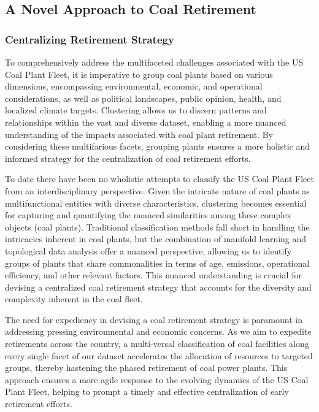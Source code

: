 \subsection{A Novel Approach to Coal Retirement}

\subsubsection{Centralizing Retirement Strategy}

To comprehensively address the multifaceted challenges associated with the US Coal Plant Fleet, it is imperative to group coal plants based on various dimensions, 
encompassing environmental, economic, and operational considerations, as well as political landscapes, public opinion, health, and localized climate targets. Clustering allows us to discern patterns and relationships within the vast and diverse dataset, 
enabling a more nuanced understanding of the impacts associated with coal plant retirement. By considering these multifarious facets, grouping plants ensures a more 
holistic and informed strategy for the centralization of coal retirement efforts.

To date there have been no wholistic attempts to classify the US Coal Plant Fleet from an interdisciplinary perspective. Given the intricate nature of coal 
plants as multifunctional entities with diverse characteristics, clustering becomes essential for capturing and quantifying the nuanced similarities among these 
complex objects (coal plants). Traditional classification methods fall short in handling the intricacies inherent in coal plants, but the combination of manifold learning and topological data analysis offer 
a nuanced perspective, allowing us to identify groups of plants that share commonalities in terms of age, emissions, operational efficiency, and other relevant factors. 
This nuanced understanding is crucial for devising a centralized coal retirement strategy that accounts for the diversity and complexity inherent in the coal fleet.

The need for expediency in devising a coal retirement strategy is paramount in addressing pressing environmental and economic concerns. As we aim to expedite retirements across the country, 
a multi-versal classification of coal facilities along every single facet of our dataset accelerates the allocation of resources to targeted groups, thereby hastening the phased retirement of 
coal power plants. This approach ensures a more agile response to the evolving dynamics of the US Coal Plant Fleet, helping to prompt a timely and effective centralization of early retirement efforts.

